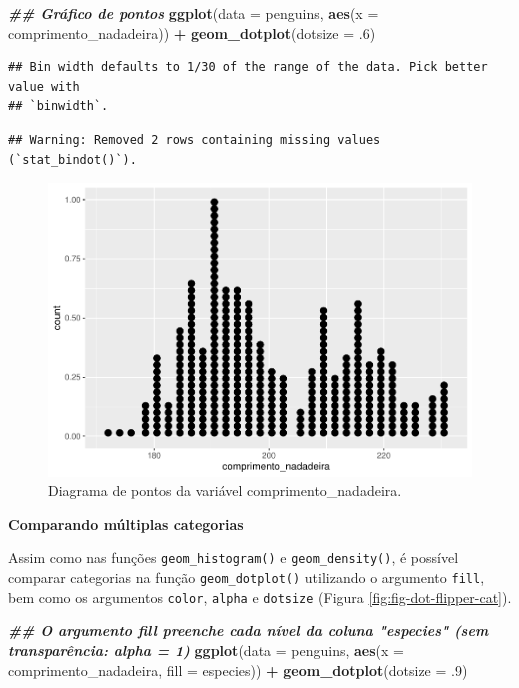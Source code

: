 \documentclass[
]{article}
\newenvironment{Shaded}{\begin{snugshade}}{\end{snugshade}}
\newcommand{\AttributeTok}[1]{\textcolor[rgb]{0.13,0.29,0.53}{#1}}
\newcommand{\DecValTok}[1]{\textcolor[rgb]{0.00,0.00,0.81}{#1}}
\newcommand{\DocumentationTok}[1]{\textcolor[rgb]{0.56,0.35,0.01}{\textbf{\textit{#1}}}}
\newcommand{\FunctionTok}[1]{\textcolor[rgb]{0.13,0.29,0.53}{\textbf{#1}}}
\newcommand{\NormalTok}[1]{#1}
\newcommand{\SpecialCharTok}[1]{\textcolor[rgb]{0.81,0.36,0.00}{\textbf{#1}}}
\begin{document}
\begin{Shaded}
\begin{Highlighting}[]
\DocumentationTok{\#\# Gráfico de pontos}
\FunctionTok{ggplot}\NormalTok{(}\AttributeTok{data =}\NormalTok{ penguins, }
       \FunctionTok{aes}\NormalTok{(}\AttributeTok{x =}\NormalTok{ comprimento\_nadadeira)) }\SpecialCharTok{+}
    \FunctionTok{geom\_dotplot}\NormalTok{(}\AttributeTok{dotsize =}\NormalTok{ .}\DecValTok{6}\NormalTok{)}
\end{Highlighting}
\end{Shaded}

\begin{verbatim}
## Bin width defaults to 1/30 of the range of the data. Pick better value with
## `binwidth`.
\end{verbatim}

\begin{verbatim}
## Warning: Removed 2 rows containing missing values (`stat_bindot()`).
\end{verbatim}

\begin{figure}
\includegraphics[width=0.75\linewidth,height=0.75\textheight]{epr_files/figure-latex/fig-dot-flipper-1} \caption{Diagrama de pontos da variável comprimento_nadadeira.}\label{fig:fig-dot-flipper}
\end{figure}

\textbf{Comparando múltiplas categorias}

Assim como nas funções \texttt{geom\_histogram()} e \texttt{geom\_density()}, é possível comparar categorias na função \texttt{geom\_dotplot()} utilizando o argumento \texttt{fill}, bem como os argumentos \texttt{color}, \texttt{alpha} e \texttt{dotsize} (Figura \ref{fig:fig-dot-flipper-cat}).

\begin{Shaded}
\begin{Highlighting}[]
\DocumentationTok{\#\# O argumento fill preenche cada nível da coluna "especies" (sem transparência: alpha = 1)}
\FunctionTok{ggplot}\NormalTok{(}\AttributeTok{data =}\NormalTok{ penguins, }
       \FunctionTok{aes}\NormalTok{(}\AttributeTok{x =}\NormalTok{ comprimento\_nadadeira, }\AttributeTok{fill =}\NormalTok{ especies)) }\SpecialCharTok{+}
    \FunctionTok{geom\_dotplot}\NormalTok{(}\AttributeTok{dotsize =}\NormalTok{ .}\DecValTok{9}\NormalTok{)}
\end{Highlighting}
\end{Shaded}
\end{document}
